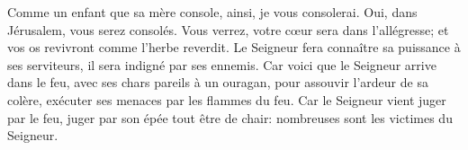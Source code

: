 Comme un enfant que sa mère console, ainsi, je vous consolerai.
	Oui, dans Jérusalem, vous serez consolés.
Vous verrez, votre cœur sera dans l’allégresse;
	et vos os revivront comme l’herbe reverdit.
Le Seigneur fera connaître sa puissance à ses serviteurs,
	il sera indigné par ses ennemis.
Car voici que le Seigneur arrive dans le feu,
	avec ses chars pareils à un ouragan,
	pour assouvir l’ardeur de sa colère,
	exécuter ses menaces par les flammes du feu.
Car le Seigneur vient juger par le feu,
	juger par son épée tout être de chair:
	nombreuses sont les victimes du Seigneur.
